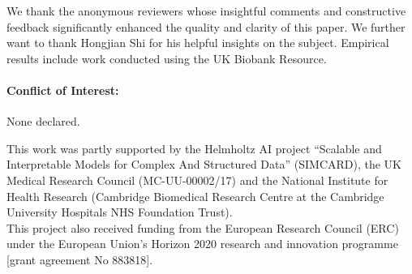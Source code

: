 \documentclass[preprint,noshowframe]{imsart}
\theoremstyle{plain}
\begin{document}

\begin{acks}[Acknowledgments]
    We thank the anonymous reviewers whose insightful comments and constructive feedback significantly enhanced the quality and clarity of this paper. We further want to thank Hongjian Shi for his helpful insights on the subject. Empirical results include work conducted using the UK Biobank Resource. \\

    \paragraph{Conflict of Interest:} None declared.
\end{acks}


\begin{funding}
    This work was partly supported by the Helmholtz AI project
    ``Scalable and Interpretable Models for Complex And Structured Data'' (SIMCARD), the UK Medical Research Council (MC-UU-00002/17) and the National Institute for Health Research (Cambridge Biomedical Research Centre at the Cambridge University Hospitals NHS Foundation Trust).
    \\

    \noindent This project also received funding from the European Research Council (ERC) under the European Union’s Horizon 2020 research and innovation programme [grant agreement No 883818].

\end{funding}

\end{document}
